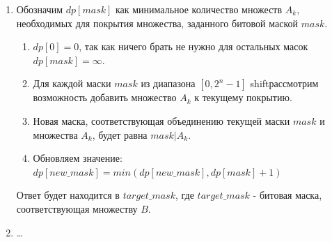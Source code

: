 \begin{enumerate}
\begin{enumerate}
    \item

    Обозначим $dp[mask]$ как минимальное количество множеств $A_k$, необходимых для покрытия множества,
    заданного битовой маской $mask$.
    
    \begin{enumerate}
    
    \item
    $dp[0] = 0$, так как ничего брать не нужно для остальных масок $dp[mask] = \infty$.

    \item
    Для каждой маски $mask$ из диапазона $[0, 2^n - 1]$ shiftрассмотрим возможность добавить множество $A_k$
    к текущему покрытию.
    
    \item
    Новая маска, соответствующая объединению текущей маски $mask$ и множества $A_k$, будет равна $mask | A_k$.
    
    \item
    Обновляем значение: $dp[new\_mask] = min(dp[new\_mask], dp[mask] + 1)$
    
    \end{enumerate}
    
    Ответ будет находится в $target\_mask$, где $target\_mask$ - битовая маска, соответствующая множеству $B$.
    

    \item \dots

\end{enumerate}

\end{enumerate}
